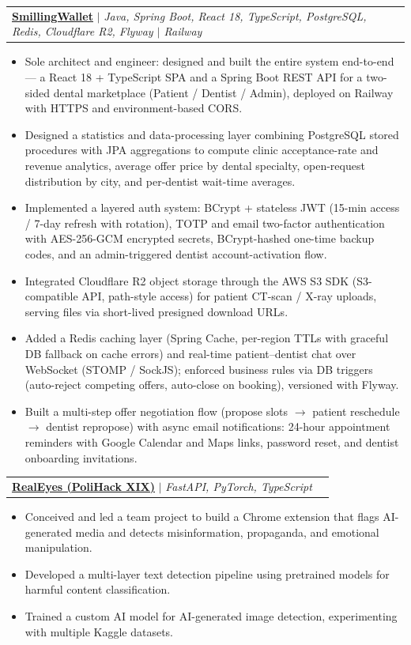 \documentclass[letterpaper,11pt]{article}
\makeatletter
\newcommand{\resumeItem}[1]{
  \item\small{
    {#1 \vspace{-2pt}}
  }
}
\newcommand{\resumeProjectHeading}[2]{
    \item
    \begin{tabular*}{0.97\textwidth}{l@{\extracolsep{\fill}}r}
      \small#1 & #2 \\
    \end{tabular*}\vspace{-7pt}
}
\newcommand{\resumeItemListStart}{\begin{itemize}[label={\raisebox{0.15ex}{\tiny$\bullet$}}]}
\newcommand{\resumeItemListEnd}{\end{itemize}\vspace{-5pt}}
\makeatother
\begin{document}
\resumeProjectHeading
{\textbf{\href{https://github.com/muresanianis450/SmillingWallet}{\underline{SmillingWallet}}} $|$ \emph{Java, Spring Boot, React 18, TypeScript, PostgreSQL, Redis, Cloudflare R2, Flyway $|$ Railway}}{}

\resumeItemListStart
    \resumeItem{Sole architect and engineer: designed and built the entire system end-to-end --- a React 18 + TypeScript SPA and a Spring Boot REST API for a two-sided dental marketplace (Patient / Dentist / Admin), deployed on Railway with HTTPS and environment-based CORS.}
    \resumeItem{Designed a statistics and data-processing layer combining PostgreSQL stored procedures with JPA aggregations to compute clinic acceptance-rate and revenue analytics, average offer price by dental specialty, open-request distribution by city, and per-dentist wait-time averages.}
    \resumeItem{Implemented a layered auth system: BCrypt + stateless JWT (15-min access / 7-day refresh with rotation), TOTP and email two-factor authentication with AES-256-GCM encrypted secrets, BCrypt-hashed one-time backup codes, and an admin-triggered dentist account-activation flow.}
    \resumeItem{Integrated Cloudflare R2 object storage through the AWS S3 SDK (S3-compatible API, path-style access) for patient CT-scan / X-ray uploads, serving files via short-lived presigned download URLs.}
    \resumeItem{Added a Redis caching layer (Spring Cache, per-region TTLs with graceful DB fallback on cache errors) and real-time patient--dentist chat over WebSocket (STOMP / SockJS); enforced business rules via DB triggers (auto-reject competing offers, auto-close on booking), versioned with Flyway.}
    \resumeItem{Built a multi-step offer negotiation flow (propose slots $\rightarrow$ patient reschedule $\rightarrow$ dentist repropose) with async email notifications: 24-hour appointment reminders with Google Calendar and Maps links, password reset, and dentist onboarding invitations.}
\resumeItemListEnd

\resumeProjectHeading
{\textbf{\href{https://github.com/The-Real-Bananas/Bananas-PoliHack}{\underline{RealEyes (PoliHack XIX)}}} $|$ \emph{FastAPI, PyTorch, TypeScript}}{}
\resumeItemListStart
    \resumeItem{Conceived and led a team project to build a Chrome extension that flags AI-generated media and detects misinformation, propaganda, and emotional manipulation.}
    \resumeItem{Developed a multi-layer text detection pipeline using pretrained models for harmful content classification.}
    \resumeItem{Trained a custom AI model for AI-generated image detection, experimenting with multiple Kaggle datasets.}
\resumeItemListEnd
\end{document}
